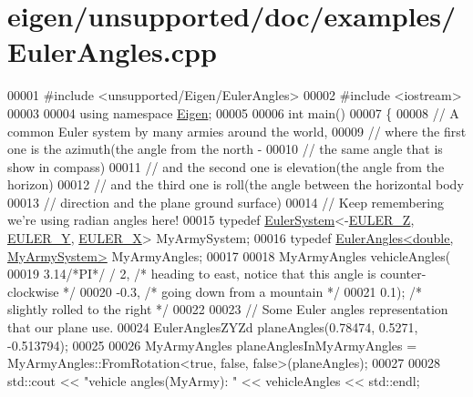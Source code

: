 \hypertarget{eigen_2unsupported_2doc_2examples_2_euler_angles_8cpp_source}{}\section{eigen/unsupported/doc/examples/\+Euler\+Angles.cpp}
\label{eigen_2unsupported_2doc_2examples_2_euler_angles_8cpp_source}

\begin{DoxyCode}
00001 \textcolor{preprocessor}{#include <unsupported/Eigen/EulerAngles>}
00002 \textcolor{preprocessor}{#include <iostream>}
00003 
00004 \textcolor{keyword}{using namespace }\hyperlink{namespace_eigen}{Eigen};
00005 
00006 \textcolor{keywordtype}{int} main()
00007 \{
00008   \textcolor{comment}{// A common Euler system by many armies around the world,}
00009   \textcolor{comment}{//  where the first one is the azimuth(the angle from the north -}
00010   \textcolor{comment}{//   the same angle that is show in compass)}
00011   \textcolor{comment}{//  and the second one is elevation(the angle from the horizon)}
00012   \textcolor{comment}{//  and the third one is roll(the angle between the horizontal body}
00013   \textcolor{comment}{//   direction and the plane ground surface)}
00014   \textcolor{comment}{// Keep remembering we're using radian angles here!}
00015   \textcolor{keyword}{typedef} \hyperlink{class_eigen_1_1_euler_system}{EulerSystem}<-\hyperlink{namespace_eigen_ae614aa7cdd687fb5c421a54f2ce5c361a0c641fd5050b5219d6c172ac83fb379d}{EULER\_Z}, \hyperlink{namespace_eigen_ae614aa7cdd687fb5c421a54f2ce5c361a7309edb53a9d9cdb77fac7c1e9200263}{EULER\_Y}, \hyperlink{namespace_eigen_ae614aa7cdd687fb5c421a54f2ce5c361ae8110af93d433bfcf247d6bac5e1d387}{EULER\_X}> MyArmySystem;
00016   \textcolor{keyword}{typedef} \hyperlink{class_eigen_1_1_euler_angles}{EulerAngles<double, MyArmySystem>} MyArmyAngles;
00017   
00018   MyArmyAngles vehicleAngles(
00019     3.14\textcolor{comment}{/*PI*/} / 2, \textcolor{comment}{/* heading to east, notice that this angle is counter-clockwise */}
00020     -0.3, \textcolor{comment}{/* going down from a mountain */}
00021     0.1); \textcolor{comment}{/* slightly rolled to the right */}
00022   
00023   \textcolor{comment}{// Some Euler angles representation that our plane use.}
00024   EulerAnglesZYZd planeAngles(0.78474, 0.5271, -0.513794);
00025   
00026   MyArmyAngles planeAnglesInMyArmyAngles = MyArmyAngles::FromRotation<true, false, false>(planeAngles);
00027   
00028   std::cout << \textcolor{stringliteral}{"vehicle angles(MyArmy):     "} << vehicleAngles << std::endl;

\end{DoxyCode}

